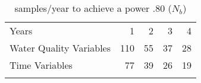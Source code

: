 \begin{table}[htbp]
\caption{samples/year to achieve a power .80 ($N_b$)}
\begin{center}
\begin{tabular}{lrrrr}
\hline\noalign{\smallskip}
Years & 1 & 2 & 3 & 4 \\ \cline{2-5}\noalign{\smallskip}
Water Quality Variables & 110 & 55 & 37 & 28 \\ 
Time Variables & 77 & 39  & 26  & 19  \\ \hline\noalign{\smallskip}
\end{tabular}
\end{center}
\label{tab:sytaapeighty}
\end{table}